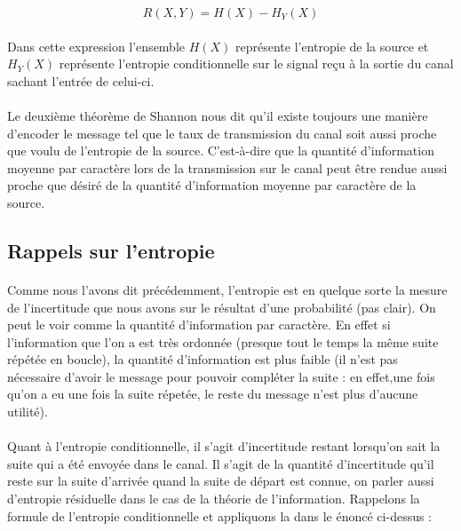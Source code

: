 	\[R(X,Y)=H(X)-H_Y(X)\]
	
	\paragraph{}
	Dans cette expression l'ensemble $H(X)$ représente l'entropie de la
	source et $H_Y(X)$ représente l'entropie conditionnelle sur le signal
	reçu à la sortie du canal sachant l'entrée de celui-ci. 
	
	\paragraph{}
	Le deuxième théorème de Shannon nous dit qu'il existe toujours une 
	manière d'encoder le message tel que le taux de transmission du canal
	soit aussi proche que voulu de l'entropie de la source. C'est-à-dire
	que la quantité d'information moyenne par caractère lors de la 
	transmission sur le canal peut être rendue aussi proche que désiré de 
	la quantité d'information moyenne par caractère de la source.
	
\subsection*{Rappels sur l'entropie}

	\paragraph{}
	Comme nous l'avons dit précédemment, l'entropie est en quelque sorte
	la mesure de l'incertitude que nous avons sur le résultat d'une 
	probabilité (pas clair). On peut le voir comme la quantité d'information
	par caractère. En effet si l'information que l'on a est très ordonnée
	(presque tout le temps la même suite répétée en boucle), la quantité 
	d'information est plus faible (il n'est pas nécessaire d'avoir le message
	pour pouvoir compléter la suite : en effet,une fois qu'on a eu une fois la suite 
	répetée, le reste du message n'est plus d'aucune utilité).
	
	\paragraph{}
	Quant à l'entropie conditionnelle, il s'agit d'incertitude restant
	lorsqu'on sait la suite qui a été envoyée dans le canal. Il s'agit
	de la quantité d'incertitude qu'il reste sur la suite d'arrivée 
	quand la suite de départ est connue, on parler aussi d'entropie 
	résiduelle dans le cas de la théorie de l'information. Rappelons la
	formule de l'entropie conditionnelle et appliquons la dans le énoncé
	ci-dessus :
	
